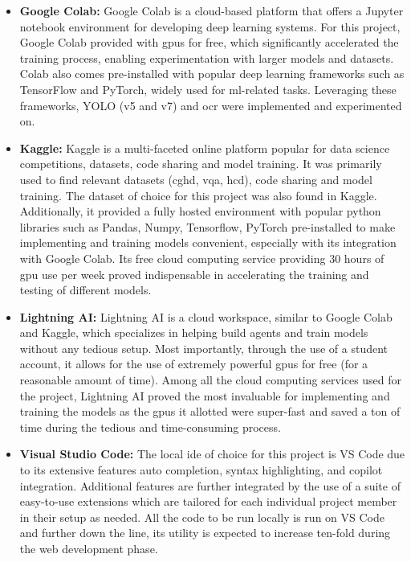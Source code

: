 \begin{itemize}
    \item \textbf{Google Colab:} Google Colab is a cloud-based platform that offers a Jupyter notebook environment for developing deep learning systems. For this project, Google Colab provided with \glspl{gpu} for free, which significantly accelerated the training process, enabling experimentation with larger models and datasets. Colab also comes pre-installed with popular deep learning frameworks such as TensorFlow and PyTorch, widely used for \gls{ml}-related tasks. Leveraging these frameworks, YOLO (v5 and v7) and \gls{ocr} were implemented and experimented on.
    
    \item \textbf{Kaggle:} Kaggle is a multi-faceted online platform popular for data science competitions, datasets, code sharing and model training. It was primarily used to find relevant datasets (\gls{cghd}, \gls{vqa}, \gls{hcd}), code sharing and model training. The dataset of choice for this project was also found in Kaggle. Additionally, it provided a fully hosted environment with popular \gls{python} libraries such as Pandas, Numpy, Tensorflow, PyTorch pre-installed to make implementing and training models convenient, especially with its integration with Google Colab. Its free cloud computing service providing 30 hours of \gls{gpu} use per week proved indispensable in accelerating the training and testing of different models.
    
    \item \textbf{Lightning AI:} Lightning AI is a cloud workspace, similar to Google Colab and Kaggle, which specializes in helping build agents and train models without any tedious setup. Most importantly, through the use of a student account, it allows for the use of extremely powerful \glspl{gpu} for free (for a reasonable amount of time). Among all the cloud computing services used for the project, Lightning AI proved the most invaluable for implementing and training the models as the \glspl{gpu} it allotted were super-fast and saved a ton of time during the tedious and time-consuming process.
    
    \item \textbf{Visual Studio Code:} The local \gls{ide} of choice for this project is VS Code due to its extensive features auto completion, syntax highlighting, and copilot integration. Additional features are further integrated by the use of a suite of easy-to-use extensions which are tailored for each individual project member in their setup as needed. All the code to be run locally is run on VS Code and further down the line, its utility is expected to increase ten-fold during the web development phase.
\end{itemize}

